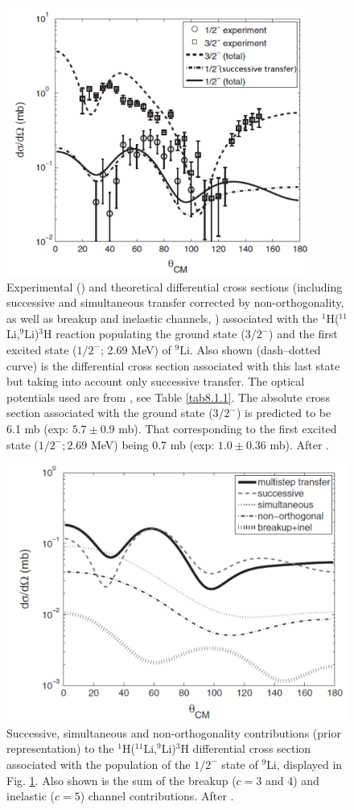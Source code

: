  \begin{figure}
 	\centerline{\includegraphics*[width=10cm,angle=0]{C8/figsC8/fig8_B_2}}
 	\caption{Experimental (\cite{Tanihata:08}) and theoretical differential cross sections (including successive and simultaneous  transfer corrected by non-orthogonality, as well as breakup and inelastic channels, \cite{Potel:10})  associated with the
 		$^1$H($^{11}$Li,$^9$Li)$^3$H  reaction populating the ground state ($3/2^-$) and the first excited state ($1/2^-$; 2.69 MeV) of $^{9}$Li. Also shown (dash--dotted curve) is the differential cross section associated with this last state but taking into account only successive transfer. The optical potentials used are from \citep{Tanihata:08,An:06}, see Table \ref{tab8.1.1}. The absolute cross section associated with the ground state ($3/2^-$) is predicted to be 6.1 mb (exp: $5.7\pm 0.9$ mb). That corresponding to the first excited state ($1/2^-; 2.69$ MeV) being 0.7 mb (exp: $1.0\pm 0.36$ mb). After \cite{Potel:10}.}\label{fig8_B_2}
 \end{figure}
 \begin{figure}
 	\centerline{\includegraphics*[width=12cm,angle=0]{C8/figsC8/fig8_B_3}}
 	\caption{Successive, simultaneous and non-orthogonality contributions (prior representation)
 		to the  $^1$H($^{11}$Li,$^9$Li)$^3$H differential cross section
 		associated with the population of the $1/2^-$ state
 		of $^9$Li, displayed in Fig. \ref{fig8_B_2}. Also shown is the  sum of the breakup ($c=3$ and 4) and inelastic ($c=5$) channel contributions. After \cite{Potel:10}.}\label{fig8_B_3}
 \end{figure}
 
